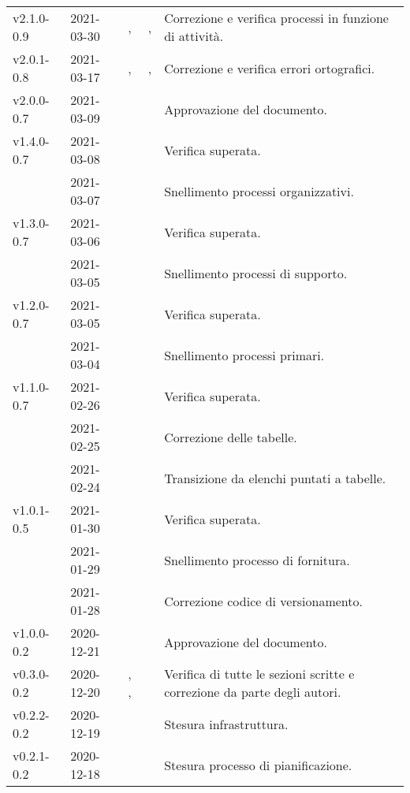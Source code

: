 {\begin{longtable}{C{.131777\freewidth} C{.134036\freewidth} C{.263554\freewidth} C{.188254\freewidth} C{.282379\freewidth}}
		v2.1.0-0.9 & 2021-03-30 & \Francesco{},\newline{} \Lucrezia{}& \ver,\newline{} \prog{} &Correzione e verifica processi in funzione di attività. \\
		v2.0.1-0.8 & 2021-03-17 & \Matteo{},\newline{} \Daniele{} & \ver{},\newline{} \progr{} &Correzione e verifica errori ortografici.\\
		v2.0.0-0.7 & 2021-03-09 & \Matteo{} & \RdP{} & Approvazione del documento. \\
		v1.4.0-0.7 & 2021-03-08 & \Davide{} & \ver{} & Verifica superata. \\
		& 2021-03-07 & \Tommaso{} & \ana{} & Snellimento processi organizzativi. \\
		v1.3.0-0.7 & 2021-03-06 & \Daniele{} & \ver{} & Verifica superata. \\
		& 2021-03-05 & \Lucrezia{} & \ana{} & Snellimento processi di supporto. \\
		 v1.2.0-0.7 & 2021-03-05 & \Davide{} & \ver{} & Verifica superata. \\
		            & 2021-03-04 & \Tommaso{} & \ana{} & Snellimento processi primari. \\
		 v1.1.0-0.7 & 2021-02-26 & \Daniele{} & \ver{} & Verifica superata. \\
		 & 2021-02-25 & \Giosue{} & \ana{} & Correzione delle tabelle. \\
		  & 2021-02-24 & \Lucrezia{} & \ana{} & Transizione da elenchi puntati a tabelle. \\ 
		 v1.0.1-0.5 & 2021-01-30 & \Daniele{} & \ver{} &  Verifica superata. \\
		 & 2021-01-29 & \Lucrezia{} & \ana{} & Snellimento processo di fornitura. \\
		 & 2021-01-28 & \Lucrezia{} & \ana{} & Correzione codice di versionamento. \\
        v1.0.0-0.2 & 2020-12-21 & \Daniele{} & \RdP{} & Approvazione del documento. \\
        
        v0.3.0-0.2 & 2020-12-20 & \Giosue{}, \Matteo{}, \Tommaso{} & \vers{} & Verifica di tutte le sezioni scritte e correzione da parte degli autori. \\ 
        v0.2.2-0.2 & 2020-12-19 & \Lucrezia{} & \ana{} & Stesura infrastruttura. \\
        v0.2.1-0.2 & 2020-12-18 & \Davide{} & \ana{} & Stesura processo di pianificazione. \\ 
		

\end{longtable}}
